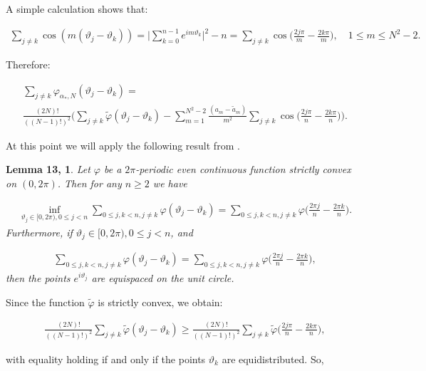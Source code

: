 \documentclass{amsart}[11pt]
\newcommand{\vphi}{\varphi}
\newcommand{\vth}{\vartheta}
\theoremstyle{definition}
\newtheorem*{manuallemma}{Lemma 13, \cite{Abakumov2020}}
\begin{document}
 A simple calculation shows that:

\begin{gather}
   \sum_{j \neq k} \cos(m(\vth_j - \vth_k)) = \bigg| \sum_{k=0}^{n-1}e^{im\vth_k} \bigg|^2 - n = \sum_{j \neq k} \cos \bigg(\frac{2j\pi}{m} - \frac{2k\pi}{m} \bigg), \quad 1 \leq m \leq N^2-2.
\end{gather}

Therefore:

\begin{gather*}
    \sum_{j \neq k} \vphi_{\alpha_{\ast},N}(\vth_j - \vth_k) = \\
\frac{(2N)!}{((N-1)!)^2}\bigg(\sum_{j \neq k}\tilde{\vphi}(\vth_j - \vth_k)- \sum_{m=1}^{N^2-2}\frac{(a_m - \tilde{a}_m)}{m^2}\sum_{j \neq k}\cos\bigg(\frac{2j\pi}{n} - \frac{2k\pi}{n} \bigg)\bigg).
\end{gather*}

At this point we will apply the following result from \cite{Abakumov2020}.

\begin{manuallemma}
\textit{Let $\vphi$ be a $2\pi$-periodic even continuous function strictly convex on $(0,2\pi)$. Then for any $n \geq 2$ we have}

\begin{gather*}
\inf_{\vth_j \in [0,2\pi), 0 \leq j < n} \sum_{0 \leq j,k <n, j \neq k} \vphi (\vth_j - \vth_k) = \sum_{0 \leq j,k <n, j \neq k}\vphi\bigg( \frac{2\pi j}{n} -\frac{2\pi k}{n} \bigg).
\end{gather*}
\textit{Furthermore, if $\vth_j \in [0,2\pi), 0 \leq j < n$, and}

\begin{gather*}
\sum_{0 \leq j,k <n, j \neq k} \vphi (\vth_j - \vth_k) = \sum_{0 \leq j,k <n, j \neq k}\vphi\bigg( \frac{2\pi j}{n} -\frac{2\pi k}{n} \bigg),
\end{gather*}
\textit{then the points $e^{i \vth_j}$ are equispaced on the unit circle.}

\end{manuallemma}

Since the function $\tilde{\vphi}$ is strictly convex, we obtain:

\begin{gather*}
\frac{(2N)!}{((N-1)!)^2} \sum_{j \neq k}\tilde{\vphi}(\vth_j - \vth_k) \geq \frac{(2N)!}{((N-1)!)^2}\sum_{j \neq k}\tilde{\vphi}\bigg(\frac{2j\pi}{n} - \frac{2k\pi}{n} \bigg),
\end{gather*}

with equality holding if and only if the points $\vth_k$ are equidistributed. So,
\end{document}
